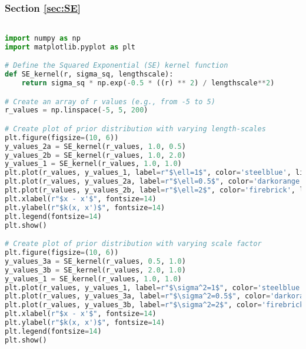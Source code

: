 \documentclass[12pt,a4paper]{article}
\begin{document}
\subsubsection{Section \ref{sec:SE}}
\begin{lstlisting}[language=python, caption={Code of the Creation of Figures \ref{fig:SE_PriorDist diff lengthscale plot} and \ref{fig:SE_PriorDist diff scalefactor plot}}]

import numpy as np
import matplotlib.pyplot as plt

# Define the Squared Exponential (SE) kernel function
def SE_kernel(r, sigma_sq, lengthscale):
    return sigma_sq * np.exp(-0.5 * ((r) ** 2) / lengthscale**2)

# Create an array of r values (e.g., from -5 to 5)
r_values = np.linspace(-5, 5, 200)

# Create plot of prior distribution with varying length-scales
plt.figure(figsize=(10, 6))
y_values_2a = SE_kernel(r_values, 1.0, 0.5)  
y_values_2b = SE_kernel(r_values, 1.0, 2.0)  
y_values_1 = SE_kernel(r_values, 1.0, 1.0)
plt.plot(r_values, y_values_1, label=r"$\ell=1$", color='steelblue', linewidth=3)
plt.plot(r_values, y_values_2a, label=r"$\ell=0.5$", color='darkorange', linewidth=3)
plt.plot(r_values, y_values_2b, label=r"$\ell=2$", color='firebrick', linewidth=3)
plt.xlabel(r"$x - x'$", fontsize=14)
plt.ylabel(r"$k(x, x')$", fontsize=14)
plt.legend(fontsize=14)
plt.show()

# Create plot of prior distribution with varying scale factor
plt.figure(figsize=(10, 6))
y_values_3a = SE_kernel(r_values, 0.5, 1.0)  
y_values_3b = SE_kernel(r_values, 2.0, 1.0)  
y_values_1 = SE_kernel(r_values, 1.0, 1.0)
plt.plot(r_values, y_values_1, label=r"$\sigma^2=1$", color='steelblue', linewidth=3)
plt.plot(r_values, y_values_3a, label=r"$\sigma^2=0.5$", color='darkorange', linewidth=3)
plt.plot(r_values, y_values_3b, label=r"$\sigma^2=2$", color='firebrick', linewidth=3)
plt.xlabel(r"$x - x'$", fontsize=14)
plt.ylabel(r"$k(x, x')$", fontsize=14)
plt.legend(fontsize=14)
plt.show()
\end{lstlisting}
\end{document}

